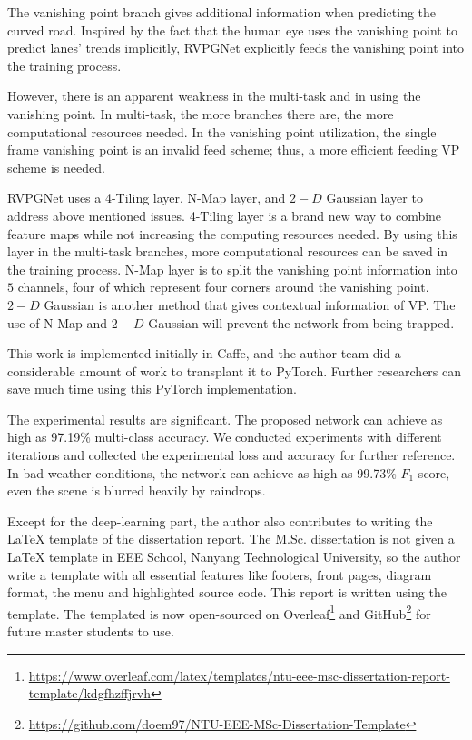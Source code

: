 \begin{spacing}{1.5}
The vanishing point branch gives additional information when predicting the curved road. Inspired by the fact that the human eye uses the vanishing point to predict lanes' trends implicitly, RVPGNet explicitly feeds the vanishing point into the training process.

However, there is an apparent weakness in the multi-task and in using the vanishing point. In multi-task, the more branches there are, the more computational resources needed. In the vanishing point utilization, the single frame vanishing point is an invalid feed scheme; thus, a more efficient feeding VP scheme is needed.

RVPGNet uses a 4-Tiling layer, N-Map layer, and $2-D$ Gaussian layer to address above mentioned issues. 4-Tiling layer is a brand new way to combine feature maps while not increasing the computing resources needed. By using this layer in the multi-task branches, more computational resources can be saved in the training process. N-Map layer is to split the vanishing point information into $5$ channels, four of which represent four corners around the vanishing point. $2-D$ Gaussian is another method that gives contextual information of VP. The use of N-Map and $2-D$ Gaussian will prevent the network from being trapped.

This work is implemented initially in Caffe, and the author team did a considerable amount of work to transplant it to PyTorch. Further researchers can save much time using this PyTorch implementation.

The experimental results are significant. The proposed network can achieve as high as 97.19\% multi-class accuracy. We conducted experiments with different iterations and collected the experimental loss and accuracy for further reference. In bad weather conditions, the network can achieve as high as 99.73\% $F_1$ score, even the scene is blurred heavily by raindrops.

Except for the deep-learning part, the author also contributes to writing the {\LaTeX} template of the dissertation report. The M.Sc. dissertation is not given a {\LaTeX} template in EEE School, Nanyang Technological University, so the author write a template with all essential features like footers, front pages, diagram format, the menu and highlighted source code. This report is written using the template. The templated is now open-sourced on Overleaf\footnote{\raggedright \url{https://www.overleaf.com/latex/templates/ntu-eee-msc-dissertation-report-template/kdgfhzffjrvh}} and GitHub\footnote{\url{https://github.com/doem97/NTU-EEE-MSc-Dissertation-Template}} for future master students to use.


\end{spacing}
